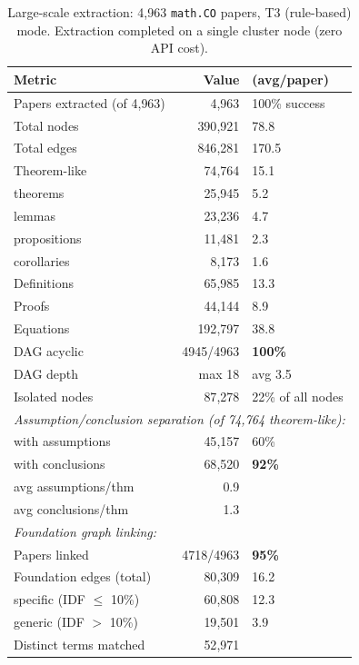 \begin{table}[h]
\centering
\small
\caption{Large-scale extraction: 4{,}963 \texttt{math.CO} papers, T3 (rule-based) mode. Extraction completed on a single cluster node (zero API cost).}
\label{tab:scale}
\begin{tabular}{lr@{\hspace{1em}}l}
\toprule
\textbf{Metric} & \textbf{Value} & \textbf{(avg/paper)} \\
\midrule
Papers extracted (of 4{,}963) & 4{,}963 & 100\% success \\
Total nodes & 390{,}921 & 78.8 \\
Total edges & 846{,}281 & 170.5 \\
\midrule
Theorem-like & 74{,}764 & 15.1 \\
\quad theorems & 25{,}945 & 5.2 \\
\quad lemmas & 23{,}236 & 4.7 \\
\quad propositions & 11{,}481 & 2.3 \\
\quad corollaries & 8{,}173 & 1.6 \\
Definitions & 65{,}985 & 13.3 \\
Proofs & 44{,}144 & 8.9 \\
Equations & 192{,}797 & 38.8 \\
\midrule
DAG acyclic & 4945/4963 & \textbf{100\%} \\
DAG depth & max 18 & avg 3.5 \\
Isolated nodes & 87{,}278 & 22\% of all nodes \\
\midrule
\multicolumn{3}{l}{\textit{Assumption/conclusion separation (of 74{,}764 theorem-like):}} \\
\quad with assumptions & 45{,}157 & 60\% \\
\quad with conclusions & 68{,}520 & \textbf{92\%} \\
\quad avg assumptions/thm & 0.9 & \\
\quad avg conclusions/thm & 1.3 & \\
\midrule
\multicolumn{3}{l}{\textit{Foundation graph linking:}} \\
\quad Papers linked & 4718/4963 & \textbf{95\%} \\
\quad Foundation edges (total) & 80{,}309 & 16.2 \\
\quad \quad specific (IDF $\leq$ 10\%) & 60{,}808 & 12.3 \\
\quad \quad generic (IDF $>$ 10\%) & 19{,}501 & 3.9 \\
\quad Distinct terms matched & 52{,}971 & \\
\bottomrule
\end{tabular}
\end{table}
